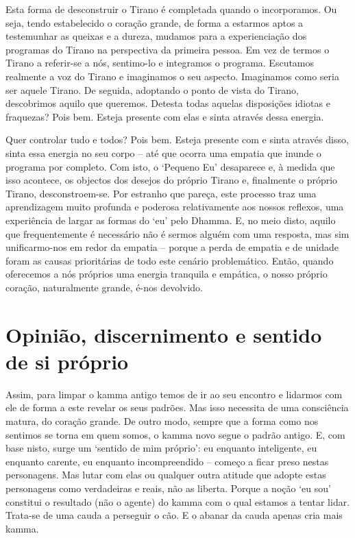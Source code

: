 Esta forma de desconstruir o Tirano é completada quando o incorporamos. Ou seja, tendo estabelecido o coração grande, de forma a estarmos aptos a testemunhar as queixas e a dureza, mudamos para a experienciação dos programas do Tirano na perspectiva da primeira pessoa. Em vez de termos o Tirano a referir-se a nós, sentimo-lo e integramos o programa. Escutamos realmente a voz do Tirano e imaginamos o seu aspecto. Imaginamos como seria ser aquele Tirano. De seguida, adoptando o ponto de vista do Tirano, descobrimos aquilo que queremos. Detesta todas aquelas disposições idiotas e fraquezas? Pois bem. Esteja presente com elas e sinta através dessa energia.

Quer controlar tudo e todos? Pois bem. Esteja presente com e sinta através disso, sinta essa energia no seu corpo -- até que ocorra uma empatia que inunde o programa por completo. Com isto, o `Pequeno Eu' desaparece e, à medida que isso acontece, os objectos dos desejos do próprio Tirano e, finalmente o próprio Tirano, desconstroem-se. Por estranho que pareça, este processo traz uma aprendizagem muito profunda e poderosa relativamente aos nossos reflexos, uma experiência de largar as formas do `eu' pelo Dhamma. E, no meio disto, aquilo que frequentemente é necessário não é sermos alguém com uma resposta, mas sim unificarmo-nos em redor da empatia -- porque a perda de empatia e de unidade foram as causas prioritárias de todo este cenário problemático. Então, quando oferecemos a nós próprios uma energia tranquila e empática, o nosso próprio coração, naturalmente grande, é-nos devolvido.

\section{Opinião, discernimento e sentido de si próprio}

Assim, para limpar o kamma antigo temos de ir ao seu encontro e lidarmos com ele de forma a este revelar os seus padrões. Mas isso necessita de uma consciência matura, do coração grande. De outro modo, sempre que a forma como nos sentimos se torna em quem somos, o kamma novo segue o padrão antigo. E, com base nisto, surge um `sentido de mim próprio': eu enquanto inteligente, eu enquanto carente, eu enquanto incompreendido -- começo a ficar preso nestas personagens. Mas lutar com elas ou qualquer outra atitude que adopte estas personagens como verdadeiras e reais, não as liberta. Porque a noção `eu sou' constitui o resultado (não o agente) do kamma com o qual estamos a tentar lidar. Trata-se de uma cauda a perseguir o cão. E o abanar da cauda apenas cria mais kamma.

